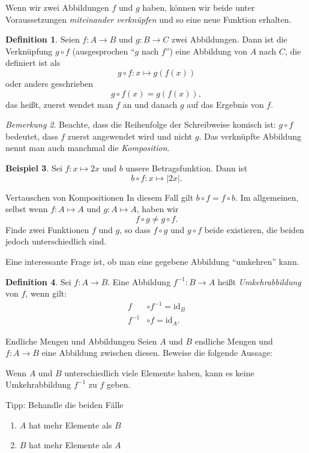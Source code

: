\documentclass[a4paper,ngerman,12pt]{zirkelblatt1415}
\theoremstyle{definition}
\newtheorem{definition}{Definition}
\newtheorem{beispiel}[definition]{Beispiel}
\theoremstyle{remark}
\newtheorem{bem}[definition]{Bemerkung}
\begin{document}
Wenn wir zwei Abbildungen $f$ und $g$ haben, können wir beide unter Voraussetzungen \emph{miteinander verknüpfen} und so eine neue Funktion erhalten.
\begin{definition}
Seien $f: A\longrightarrow B$ und $g: B\longrightarrow C$ zwei Abbildungen. Dann ist die Verknüpfung $g\circ f$ (ausgesprochen "`$g$ nach $f$"') eine Abbildung von $A$ nach $C$, die definiert ist als
\[
g\circ f: x \mapsto g\left(f(x)\right)
\]
oder anders geschrieben
\begin{equation*}
  g\circ f(x)=g(f(x)),
\end{equation*}
das heißt, zuerst wendet man $f$ an und danach $g$ auf das Ergebnis von $f$.
\end{definition}

\begin{bem}
  Beachte, dass die Reihenfolge der Schreibweise komisch ist: $g\circ f$ bedeutet, dass $f$ zuerst angewendet wird und nicht $g$. Das verknüpfte Abbildung nennt man auch manchmal die \emph{Komposition}.
\end{bem}

\begin{beispiel}
Sei $f:x\mapsto 2x$ und $b$ unsere Betragsfunktion. Dann ist
\[
b\circ f: x\mapsto |2x|.
\]
\end{beispiel}

\begin{aufgabe}{Vertauschen von Kompositionen}
In diesem Fall gilt $b\circ f = f \circ b$. Im allgemeinen, selbst wenn $f:A\mapsto A$ und $g:A\mapsto A$, haben wir
\[
f\circ g \neq g \circ f.
\]
Finde zwei Funktionen $f$ und $g$, so dass $f\circ g$ und $g\circ f$ beide existieren, die beiden jedoch unterschiedlich sind. 
\end{aufgabe}

Eine interessante Frage ist, ob man eine gegebene Abbildung "`umkehren"' kann.
\begin{definition}
Sei $f:A\longrightarrow B$. Eine Abbildung $f^{-1}:B\longrightarrow A$ heißt \emph{Umkehrabbildung} von $f$, wenn gilt:
\begin{align*}
f&\circ f^{-1} = \text{id}_B\\
f^{-1}&\circ f = \text{id}_A.
\end{align*}
\end{definition}

\begin{aufgabe}{Endliche Mengen und Abbildungen}
Seien $A$ und $B$ endliche Mengen und $f:A\longrightarrow B$ eine Abbildung zwischen diesen. Beweise die folgende Aussage:

Wenn $A$ und $B$ unterschiedlich viele Elemente haben, kann es keine Umkehrabbildung $f^{-1}$ zu $f$ geben.

Tipp: Behandle die beiden Fälle
\begin{enumerate}
\item $A$ hat mehr Elemente als $B$
\item $B$ hat mehr Elemente als $A$
\end{enumerate}
\end{aufgabe}
\end{document}
